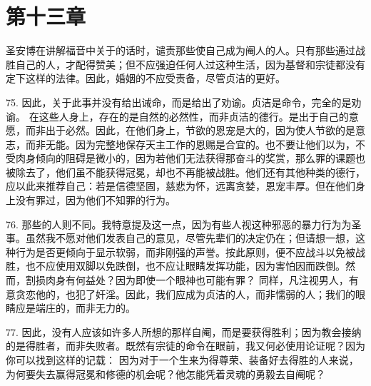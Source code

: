 
\section{第十三章}

圣安博在讲解福音中关于的话时，谴责那些使自己成为阉人的人。只有那些通过战胜自己的人，才配得赞美；但不应强迫任何人过这种生活，因为基督和宗徒都没有定下这样的法律。因此，婚姻的不应受责备，尽管贞洁的更好。\par

75. 因此，关于此事并没有给出诫命，而是给出了劝谕。贞洁是命令，完全的是劝谕。 在这些人身上，存在的是自然的必然性，而非贞洁的德行。是出于自己的意愿，而非出于必然。因此，在他们身上，节欲的恩宠是大的，因为使人节欲的是意志，而非无能。因为完整地保存天主工作的恩赐是合宜的。也不要让他们以为，不受肉身倾向的阻碍是微小的，因为若他们无法获得那奋斗的奖赏，那么罪的课题也被除去了，他们虽不能获得冠冕，却也不再能被战胜。他们还有其他种类的德行，应以此来推荐自己：若是信德坚固，慈悲为怀，远离贪婪，恩宠丰厚。但在他们身上没有罪过，因为他们不知罪的行为。\par

76. 那些的人则不同。我特意提及这一点，因为有些人视这种邪恶的暴力行为为圣事。虽然我不愿对他们发表自己的意见，尽管先辈们的决定仍在；但请想一想，这种行为是否更倾向于显示软弱，而非刚强的声誉。按此原则，便不应战斗以免被战胜，也不应使用双脚以免跌倒，也不应让眼睛发挥功能，因为害怕因而跌倒。然而，割损肉身有何益处？因为即使一个眼神也可能有罪？ 同样，凡注视男人，有意贪恋他的，也犯了奸淫。因此，我们应成为贞洁的人，而非懦弱的人；我们的眼睛应是端庄的，而非无力的。\par

77. 因此，没有人应该如许多人所想的那样自阉，而是要获得胜利；因为教会接纳的是得胜者，而非失败者。既然有宗徒的命令在眼前，我又何必使用论证呢？因为你可以找到这样的记载： 因为对于一个生来为得尊荣、装备好去得胜的人来说，为何要失去赢得冠冕和修德的机会呢？他怎能凭着灵魂的勇毅去自阉呢？ \par

